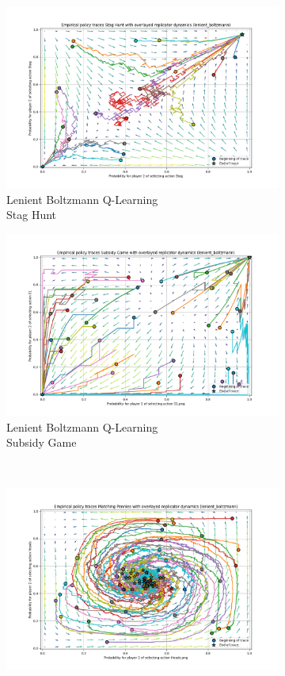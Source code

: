 \documentclass[12pt,letterpaper, onecolumn]{exam}
\begin{document}
\begin{figure}
    \begin{subfigure}{.5\textwidth}
      \centering
      \includegraphics[width=.6\linewidth]{plots/replicator_trajectoreis_Stag Hunt_lenient_boltzmann.png}
      \caption{Lenient Boltzmann Q-Learning\\ Stag Hunt}
      \label{fig:sfiglbsh}
    \end{subfigure}%
    \begin{subfigure}{.5\textwidth}
      \centering
      \includegraphics[width=.6\linewidth]{plots/replicator_trajectoreis_Subsidy Game_lenient_boltzmann.png}
      \caption{Lenient Boltzmann Q-Learning\\ Subsidy Game}
      \label{fig:sfiglbsg}
    \end{subfigure}\\
    \begin{subfigure}{.5\textwidth}
      \centering
      \includegraphics[width=.6\linewidth]{plots/replicator_trajectoreis_Matching Pennies_lenient_boltzmann.png}

\end{subfigure}
\end{figure}
\end{document}
